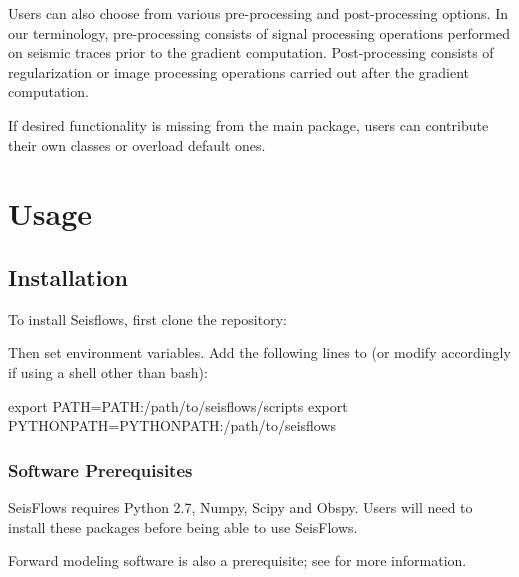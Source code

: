 \documentclass[letterpaper,10pt,english]{sphinxmanual}
\begin{document}
Users can also choose from various pre-processing and post-processing options. In our terminology, pre-processing consists of signal processing operations performed on seismic traces prior to the gradient computation.  Post-processing consists of regularization or image processing operations carried out after the gradient computation.

If desired functionality is missing from the main package, users can contribute their own classes or overload default ones.


\chapter{Usage}
\label{\detokenize{index:usage}}

\section{Installation}
\label{\detokenize{main/usage:installation}}\label{\detokenize{main/usage::doc}}
To install Seisflows, first clone the repository:

\begin{sphinxVerbatim}[commandchars=\\\{\}]
  
\end{sphinxVerbatim}

Then set environment variables. Add the following lines to  (or modify accordingly if using a shell other than bash):

\begin{sphinxVerbatim}[commandchars=\\\{\}]
export PATH=\PYGZdl{}PATH:/path/to/seisflows/scripts
export PYTHONPATH=\PYGZdl{}PYTHONPATH:/path/to/seisflows
\end{sphinxVerbatim}


\subsection{Software Prerequisites}
\label{\detokenize{main/usage:software-prerequisites}}
SeisFlows requires Python 2.7, Numpy, Scipy and Obspy.  Users will need to install these packages before being able to use SeisFlows.

Forward modeling software is also a prerequisite; see {\hyperref[\detokenize{main/usage:solver}]{}} for more information.
\end{document}
